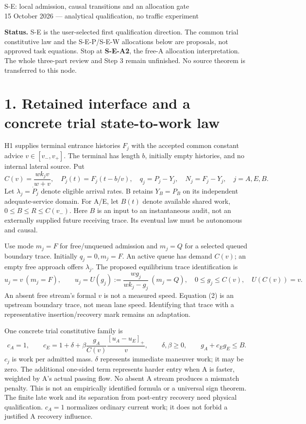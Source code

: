 \documentclass[11pt,a4paper]{article}
\newcommand{\pos}[1]{[#1]_+}
\begin{document}
\begin{center}
{\Large S-E: local admission, causal transitions and an allocation gate}\\[4pt]
15 October 2026 --- analytical qualification, no traffic experiment
\end{center}

\textbf{Status.} S-E is the user-selected first qualification direction.
The common trial constitutive law and the S-E-P/S-E-W allocations below
are proposals, not approved task equations. Stop at \textbf{S-E-A2}, the
free-A allocation interpretation. The whole three-part review and Step 3
remain unfinished. No source theorem is transferred to this node.

\section*{1. Retained interface and a concrete trial state-to-work law}

H1 supplies terminal entrance histories $F_j$ with the accepted common
constant advice $v\in[v_-,v_+]$. The terminal has length $b$, initially
empty histories, and no internal lateral source. Put
\begin{equation}
 C(v)=\frac{wk_jv}{w+v},\quad
 P_j(t)=F_j(t-b/v),\quad q_j=P_j-Y_j,\quad N_j=F_j-Y_j,
 \quad j=A,E,B. \tag{1}
\end{equation}
Let $\lambda_j=\dot P_j$ denote eligible arrival rates. B retains
$Y_B=P_B$ on its independent adequate-service domain. For A/E, let $B(t)$
denote available shared work, $0\leq B\leq R\leq C(v_-)$.
Here $B$ is an input to an instantaneous audit, not an externally supplied
future receiving trace. Its eventual law must be autonomous and causal.

Use mode $m_j=F$ for free/unqueued admission and $m_j=Q$ for a selected
queued boundary trace. Initially $q_j=0,m_j=F$. An active queue has demand
$C(v)$; an empty free approach offers $\lambda_j$. The proposed equilibrium
trace identification is
\begin{equation}
 u_j=v\ (m_j=F),\qquad
 u_j=U(g_j):=\frac{wg_j}{wk_j-g_j}\ (m_j=Q),\quad
 0\leq g_j\leq C(v),\quad U(C(v))=v. \tag{2}
\end{equation}
An absent free stream's formal $v$ is not a measured speed. Equation (2)
is an upstream boundary trace, not mean lane speed. Identifying that trace
with a representative insertion/recovery mark remains an adaptation.

One concrete trial constitutive family is
\begin{equation}
 c_A=1,\qquad
 c_E=1+\delta+\beta\frac{g_A}{C(v)}
          \frac{\pos{u_A-u_E}}v,\qquad \delta,\beta\geq0,
 \qquad g_A+c_Eg_E\leq B. \tag{3}
\end{equation}
$c_j$ is work per admitted mass. $\delta$ represents immediate maneuver
work; it may be zero. The additional one-sided term represents harder
entry when A is faster, weighted by A's actual passing flow. No absent A
stream produces a mismatch penalty. This is not an empirically identified
formula or a universal sign theorem. The finite late work and its separation
from post-entry recovery need physical qualification. $c_A=1$ normalizes
ordinary current work; it does not forbid a justified A recovery influence.
\end{document}
